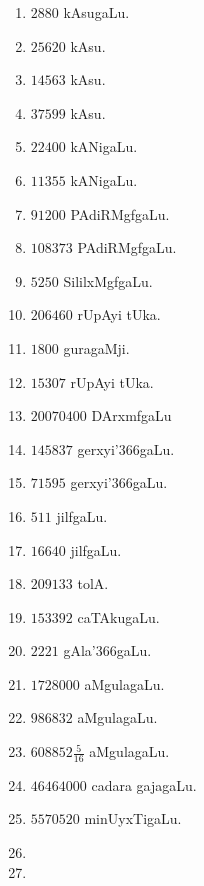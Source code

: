 
\begin{multicols}{3}
\begin{enumerate}[$(1)$]
\item $2880$ kAsugaLu.
\item $25620$ kAsu.
\item $14563$ kAsu. 
\item $37599$ kAsu.
\item $22400$ kANigaLu. 
\item $11355$ kANigaLu.
\item $91200$  PAdiRMgfgaLu. 
\item $108373$ PAdiRMgfgaLu.
\item $5250$ SililxMgfgaLu. 
\item $206460$ rUpAyi tUka.
\item $1800$ guragaMji. 
\item $15307$ rUpAyi tUka.
\item $20070400$ DArxmfgaLu 
\item $145837$ gerxyi\char'366gaLu.
\item $71595$ gerxyi\char'366gaLu. 
\item $511$ jilfgaLu.
\item $16640$ jilfgaLu. 
\item $209133$ tolA.
\item $153392$ caTAkugaLu. 
\item $2221$ gAla\char'366gaLu.
\item $1728000$ aMgulagaLu. 
\item $986832$ aMgulagaLu.
\item $608852 \frac{5}{16}$ aMgulagaLu. 
\item $46464000$ cadara gajagaLu.
\item $5570520$ minUyxTigaLu.
\item[]
\item[]
\end{enumerate}
\end{multicols}


